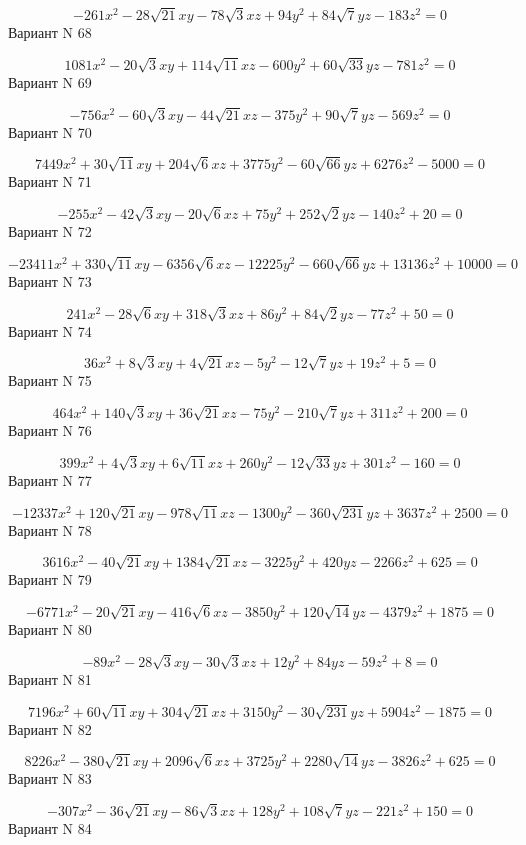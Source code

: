 \documentclass[11pt]{report}
\begin{document}
$$- 261 x^{2} - 28 \sqrt{21} x y - 78 \sqrt{3} x z + 94 y^{2} + 84 \sqrt{7} y z - 183 z^{2} = 0$$Вариант N 68

$$1081 x^{2} - 20 \sqrt{3} x y + 114 \sqrt{11} x z - 600 y^{2} + 60 \sqrt{33} y z - 781 z^{2} = 0$$Вариант N 69

$$- 756 x^{2} - 60 \sqrt{3} x y - 44 \sqrt{21} x z - 375 y^{2} + 90 \sqrt{7} y z - 569 z^{2} = 0$$Вариант N 70

$$7449 x^{2} + 30 \sqrt{11} x y + 204 \sqrt{6} x z + 3775 y^{2} - 60 \sqrt{66} y z + 6276 z^{2} - 5000 = 0$$Вариант N 71

$$- 255 x^{2} - 42 \sqrt{3} x y - 20 \sqrt{6} x z + 75 y^{2} + 252 \sqrt{2} y z - 140 z^{2} + 20 = 0$$Вариант N 72

$$- 23411 x^{2} + 330 \sqrt{11} x y - 6356 \sqrt{6} x z - 12225 y^{2} - 660 \sqrt{66} y z + 13136 z^{2} + 10000 = 0$$Вариант N 73

$$241 x^{2} - 28 \sqrt{6} x y + 318 \sqrt{3} x z + 86 y^{2} + 84 \sqrt{2} y z - 77 z^{2} + 50 = 0$$Вариант N 74

$$36 x^{2} + 8 \sqrt{3} x y + 4 \sqrt{21} x z - 5 y^{2} - 12 \sqrt{7} y z + 19 z^{2} + 5 = 0$$Вариант N 75

$$464 x^{2} + 140 \sqrt{3} x y + 36 \sqrt{21} x z - 75 y^{2} - 210 \sqrt{7} y z + 311 z^{2} + 200 = 0$$Вариант N 76

$$399 x^{2} + 4 \sqrt{3} x y + 6 \sqrt{11} x z + 260 y^{2} - 12 \sqrt{33} y z + 301 z^{2} - 160 = 0$$Вариант N 77

$$- 12337 x^{2} + 120 \sqrt{21} x y - 978 \sqrt{11} x z - 1300 y^{2} - 360 \sqrt{231} y z + 3637 z^{2} + 2500 = 0$$Вариант N 78

$$3616 x^{2} - 40 \sqrt{21} x y + 1384 \sqrt{21} x z - 3225 y^{2} + 420 y z - 2266 z^{2} + 625 = 0$$Вариант N 79

$$- 6771 x^{2} - 20 \sqrt{21} x y - 416 \sqrt{6} x z - 3850 y^{2} + 120 \sqrt{14} y z - 4379 z^{2} + 1875 = 0$$Вариант N 80

$$- 89 x^{2} - 28 \sqrt{3} x y - 30 \sqrt{3} x z + 12 y^{2} + 84 y z - 59 z^{2} + 8 = 0$$Вариант N 81

$$7196 x^{2} + 60 \sqrt{11} x y + 304 \sqrt{21} x z + 3150 y^{2} - 30 \sqrt{231} y z + 5904 z^{2} - 1875 = 0$$Вариант N 82

$$8226 x^{2} - 380 \sqrt{21} x y + 2096 \sqrt{6} x z + 3725 y^{2} + 2280 \sqrt{14} y z - 3826 z^{2} + 625 = 0$$Вариант N 83

$$- 307 x^{2} - 36 \sqrt{21} x y - 86 \sqrt{3} x z + 128 y^{2} + 108 \sqrt{7} y z - 221 z^{2} + 150 = 0$$Вариант N 84
\end{document}
